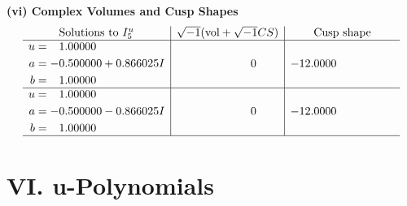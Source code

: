 \documentclass[1p]{elsarticle_modified}
\theoremstyle{definition}
\newcommand{\I}{\sqrt{-1}}
\begin{document}
\newpage\flushleft \textbf{(vi) Complex Volumes and Cusp Shapes}
$$\begin{array}{c|c|c}  
\text{Solutions to }I^u_{5}& \I (\text{vol} + \sqrt{-1}CS) & \text{Cusp shape}\\
 \hline 
\begin{aligned}
u &= \phantom{-}1.00000\phantom{ +0.000000I} \\
a &= -0.500000 + 0.866025 I \\
b &= \phantom{-}1.00000\phantom{ +0.000000I}\end{aligned}
 & \phantom{-0.000000 } 0 & -12.0000\phantom{ +0.000000I} \\ \hline\begin{aligned}
u &= \phantom{-}1.00000\phantom{ +0.000000I} \\
a &= -0.500000 - 0.866025 I \\
b &= \phantom{-}1.00000\phantom{ +0.000000I}\end{aligned}
 & \phantom{-0.000000 } 0 & -12.0000\phantom{ +0.000000I}\\
 \hline 
 \end{array}$$\newpage
\newpage\renewcommand{\arraystretch}{1}
\centering \section*{ VI. u-Polynomials}
\end{document}

